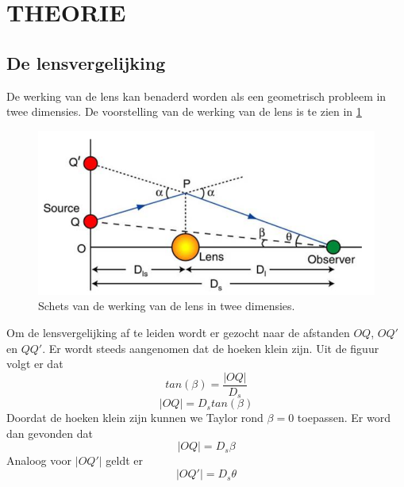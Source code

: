 \section{THEORIE}
\subsection{De lensvergelijking}
De werking van de lens kan benaderd worden als een geometrisch probleem in twee dimensies. De voorstelling van de werking van de lens is te zien in \cref{fig:lensvgl}
\begin{figure}[H]
    \centering
    \includegraphics[scale=0.5]{Figures/Lensvergelijking.png}
    \caption{Schets van de werking van de lens in twee dimensies.}
    \label{fig:lensvgl}
\end{figure}\mbox{}
Om de lensvergelijking af te leiden wordt er gezocht naar de afstanden $OQ$, $OQ'$ en $QQ'$. Er wordt steeds aangenomen dat de hoeken klein zijn. Uit de figuur volgt er dat
$$tan(\beta) = \frac{|OQ|}{D_{s}}$$
$$|OQ| = D_{s}tan(\beta)$$
Doordat de hoeken klein zijn kunnen we Taylor rond $\beta=0$ toepassen. Er word dan gevonden dat
\begin{equation}
  |OQ| = D_{s}\beta  
  \label{for:OQ}
\end{equation}
Analoog voor $|OQ'|$ geldt er
\begin{equation}
   |OQ'| = D_{s}\theta 
   \label{for:OQ'}
\end{equation}
